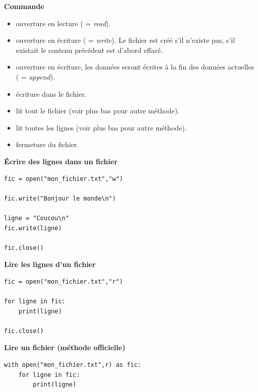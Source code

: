 \documentclass[11pt,class=report,crop=false]{standalone}
\begin{document}
\textbf{Commande} 

\begin{itemize}
  \item {} \quad ouverture en lecture ( = \emph{read}).
  \item {} \quad ouverture en écriture ( = \emph{write}). Le fichier est créé s'il n'existe pas, s'il existait le contenu précédent est d'abord effacé.
  \item {} \quad ouverture en écriture, les données seront écrites à la fin des données actuelles ( = \emph{append}).
  
  \item {} \quad écriture dans le fichier.
  \item {} \quad lit tout le fichier (voir plus bas pour autre méthode).
  \item {} \quad lit toutes les lignes (voir plus bas pour autre méthode).
  
  \item {} \quad fermeture du fichier.
\end{itemize}

\bigskip

\textbf{\'Ecrire des lignes dans un fichier} 

\begin{lstlisting}
fic = open("mon_fichier.txt","w")

fic.write("Bonjour le monde\n")

ligne = "Coucou\n"
fic.write(ligne)

fic.close()
\end{lstlisting}



\bigskip

\textbf{Lire les lignes d'un fichier} 

\begin{lstlisting}
fic = open("mon_fichier.txt","r")

for ligne in fic:
    print(ligne)

fic.close()
\end{lstlisting}


\bigskip

\textbf{Lire un fichier (méthode officielle)} 

\begin{lstlisting}
with open("mon_fichier.txt",r) as fic: 
    for ligne in fic: 
        print(ligne) 
\end{lstlisting}
\end{document}
